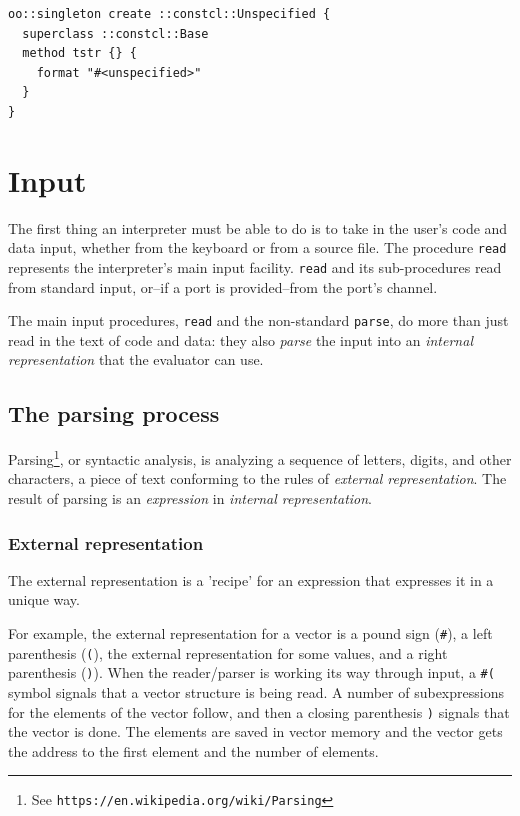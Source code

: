 \documentclass[a5paper,draft]{memoir}
\begin{document}
\begin{lstlisting}
oo::singleton create ::constcl::Unspecified {
  superclass ::constcl::Base
  method tstr {} {
    format "#<unspecified>"
  }
}
\end{lstlisting}

\chapter{Input}
\label{input}

The first thing an interpreter must be able to do is to take in the user's code and data input, whether from the keyboard or from a source file. The procedure \texttt{read} represents the interpreter's main input facility. \texttt{read} and its sub-procedures read from standard input, or--if a port is provided--from the port's channel.

The main input procedures, \texttt{read} and the non-standard \texttt{parse}, do more than just read in the text of code and data: they also \emph{parse} the input into an \emph{internal representation} that the evaluator can use.

\section{The parsing process}
\label{the-parsing-process}

Parsing\footnote{See \texttt{https://en.wikipedia.org/wiki/Parsing}}, or syntactic analysis, is analyzing a sequence of letters, digits, and other characters, a piece of text conforming to the rules of \emph{external representation}. The result of parsing is an \emph{expression} in \emph{internal representation}.

\subsection{External representation}
\label{external-representation}

The external representation is a 'recipe' for an expression that expresses it in a unique way.

For example, the external representation for a vector is a pound sign (\texttt{\#}), a left parenthesis (\texttt{(}), the external representation for some values, and a right parenthesis (\texttt{)}). When the reader/parser is working its way through input, a \texttt{\#(} symbol signals that a vector structure is being read. A number of subexpressions for the elements of the vector follow, and then a closing parenthesis \texttt{)} signals that the vector is done. The elements are saved in vector memory and the vector gets the address to the first element and the number of elements.
\end{document}
